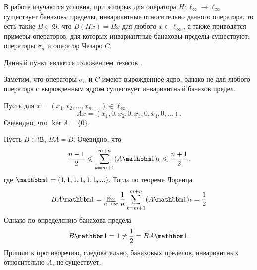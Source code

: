 В работе \cite{Semenov2010invariant} изучаются условия,
при которых для оператора $H:\ell_\infty\to \ell_\infty$ существует банаховы пределы,
инвариантные относительно данного оператора, то есть такие $B\in\mathfrak{B}$,
что $B(Hx) = Bx$ для любого $x\in\ell_\infty$,
а также приводятся примеры операторов, для которых инвариантные банаховы пределы существуют:
операторы $\sigma_n$ и оператор Чезаро $C$.

Данный пункт является изложением тезисов \cite{our-vvmsh-2018}.

Заметим, что операторы $\sigma_n$ и $C$ имеют вырожденное ядро,
однако не для любого оператора с вырожденным ядром существует инвариантный банахов предел.

\begin{example}
	Пусть для $x = (x_1, x_2, ..., x_n, ...)\in \ell_\infty$
	\begin{equation*}
		Ax = (x_1, 0, x_2, 0, x_3, 0, x_4, 0, ...).
	\end{equation*}
	Очевидно, что $\ker A = \{0\}$.
\end{example}

Пусть $B\in\mathfrak{B}$, $BA = B$.
Очевидно, что
\begin{equation*}
	\frac{n-1}{2}\leqslant \sum_{k=m+1}^{m+n} (A\one)_k \leqslant \frac{n+1}{2},
\end{equation*}
где $\one = (1, 1, 1, 1, 1, 1, ...)$.
Тогда по теореме Лоренца
\begin{equation*}
	BA\one =
	\lim_{n\to\infty} \frac{1}{n}\sum_{k=m+1}^{m+n} (A\one)_k = \frac{1}{2}
\end{equation*}
Однако по определению банахова предела
\begin{equation*}
	B\one = 1 \neq \frac{1}{2} = BA\one.
\end{equation*}
Пришли к противоречию, следовательно, банаховых пределов, инвариантных относительно $A$, не существует.
